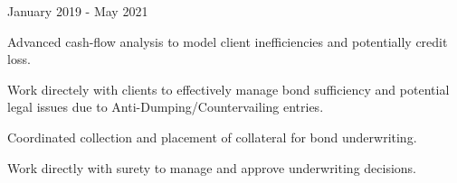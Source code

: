 \begin{cventries}
        {January 2019 - May 2021}
        {
          \begin{cvitems}
            \item {Advanced cash-flow analysis to model client inefficiencies and potentially credit loss.}
            \item {Work directely with clients to effectively manage bond sufficiency and potential legal issues due to Anti-Dumping/Countervailing entries.}
            \item {Coordinated collection and placement of collateral for bond underwriting.}
            \item {Work directly with surety to manage and approve underwriting decisions.}
          \end{cvitems}
        } 
\end{cventries}
